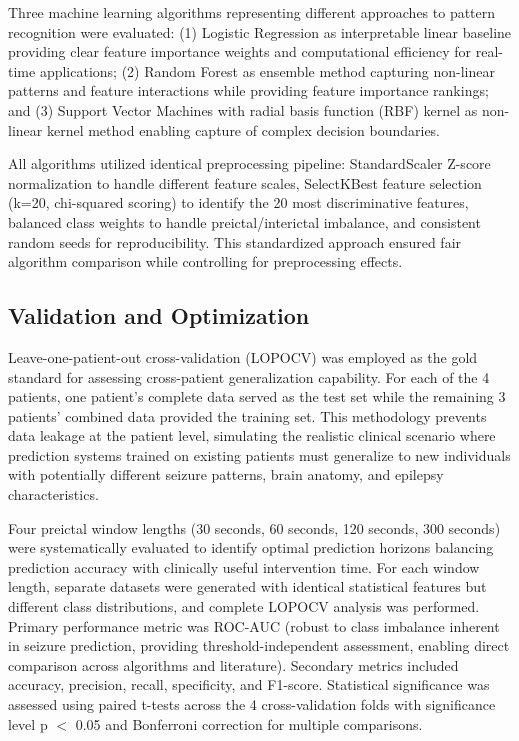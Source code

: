 \documentclass[conference]{IEEEtran}
\begin{document}
Three machine learning algorithms representing different approaches to pattern recognition were evaluated: (1) Logistic Regression as interpretable linear baseline providing clear feature importance weights and computational efficiency for real-time applications; (2) Random Forest as ensemble method capturing non-linear patterns and feature interactions while providing feature importance rankings; and (3) Support Vector Machines with radial basis function (RBF) kernel as non-linear kernel method enabling capture of complex decision boundaries.

All algorithms utilized identical preprocessing pipeline: StandardScaler Z-score normalization to handle different feature scales, SelectKBest feature selection (k=20, chi-squared scoring) to identify the 20 most discriminative features, balanced class weights to handle preictal/interictal imbalance, and consistent random seeds for reproducibility. This standardized approach ensured fair algorithm comparison while controlling for preprocessing effects.

\subsection{Validation and Optimization}
Leave-one-patient-out cross-validation (LOPOCV) was employed as the gold standard for assessing cross-patient generalization capability. For each of the 4 patients, one patient's complete data served as the test set while the remaining 3 patients' combined data provided the training set. This methodology prevents data leakage at the patient level, simulating the realistic clinical scenario where prediction systems trained on existing patients must generalize to new individuals with potentially different seizure patterns, brain anatomy, and epilepsy characteristics.

Four preictal window lengths (30 seconds, 60 seconds, 120 seconds, 300 seconds) were systematically evaluated to identify optimal prediction horizons balancing prediction accuracy with clinically useful intervention time. For each window length, separate datasets were generated with identical statistical features but different class distributions, and complete LOPOCV analysis was performed. Primary performance metric was ROC-AUC (robust to class imbalance inherent in seizure prediction, providing threshold-independent assessment, enabling direct comparison across algorithms and literature). Secondary metrics included accuracy, precision, recall, specificity, and F1-score. Statistical significance was assessed using paired t-tests across the 4 cross-validation folds with significance level p $<$ 0.05 and Bonferroni correction for multiple comparisons.
\end{document}
